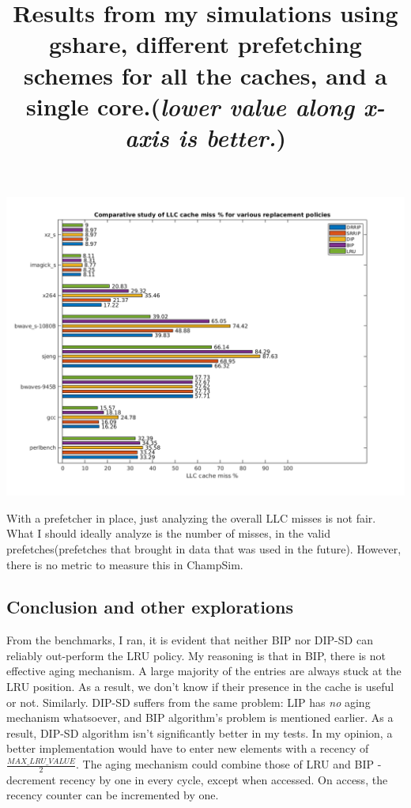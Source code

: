 \documentclass[a4paper]{article}
\begin{document}
            \begin{center}
                \includegraphics[width=\linewidth]{images/shubhayu/LLC_gshare.png}
                \title{Results from my simulations using gshare, different prefetching schemes for all the caches, and a single core.(\textit{lower value along x-axis is better.})}
            \end{center}
            
            With a prefetcher in place, just analyzing the overall LLC misses is not fair. What I should ideally analyze is the number of misses, in the valid prefetches(prefetches that brought in data that was used in the future). However, there is no metric to measure this in ChampSim.

        \subsection{Conclusion and other explorations}
            From the benchmarks, I ran, it is evident that neither BIP nor DIP-SD can reliably out-perform the LRU policy. My reasoning is that in BIP, there is not effective aging mechanism. A large majority of the entries are always stuck at the LRU position. As a result, we don't know if their presence in the cache is useful or not. Similarly. DIP-SD suffers from the same problem: LIP has \textit{no} aging mechanism whatsoever, and BIP algorithm's problem is mentioned earlier. As a result, DIP-SD algorithm isn't significantly better in my tests. In my opinion, a better implementation would have to enter new elements with a recency of $\displaystyle\frac{MAX\_LRU\_VALUE}{2}$. The aging mechanism could combine those of LRU and BIP - decrement recency by one in every cycle, except when accessed. On access, the recency counter can be incremented by one.\\
            
\end{document}

